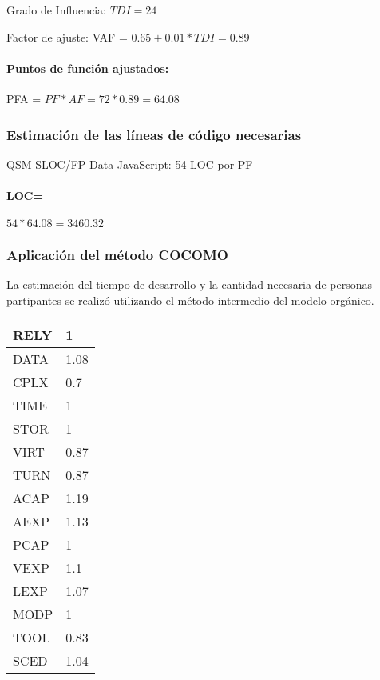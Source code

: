 Grado de Influencia: $TDI = 24$

Factor de ajuste: VAF = $0.65 + 0.01 * TDI = 0.89$


\paragraph{Puntos de función ajustados:} 

PFA = $PF * AF = 72 * 0.89 = 64.08$

\subsubsection{Estimación de las líneas de código necesarias}

QSM SLOC/FP Data JavaScript: 54 LOC por PF


\paragraph{LOC=} $54*64.08 = 3460.32$
        
\subsubsection{Aplicación del método COCOMO}

    La estimación del tiempo de desarrollo y la cantidad necesaria de personas partipantes se realizó utilizando el método intermedio del modelo orgánico.

\begin{table}[H]
\centering
    \begin{tabular}{|l|l|}
        \hline
        RELY & 1    \\ \hline
        DATA & 1.08 \\ \hline
        CPLX & 0.7  \\ \hline
        TIME & 1    \\ \hline
        STOR & 1    \\ \hline
        VIRT & 0.87 \\ \hline
        TURN & 0.87 \\ \hline
        ACAP & 1.19 \\ \hline
        AEXP & 1.13 \\ \hline
        PCAP & 1    \\ \hline
        VEXP & 1.1  \\ \hline
        LEXP & 1.07 \\ \hline
        MODP & 1    \\ \hline
        TOOL & 0.83 \\ \hline
        SCED & 1.04 \\
        \hline
    \end{tabular}
\end{table}
    
